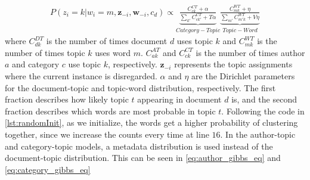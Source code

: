 \begin{equation}\label{eq:category_gibbs_eq}
	\begin{split}
		P(z_i = k|w_i = m, \boldsymbol{z}_{-i}, \boldsymbol{w}_{-i}, c_d) \propto 
		\underbrace{\frac{C^{CT}_{ck} + \alpha}{\sum_{k'} C^{CT}_{ck'} + T\alpha}}_{Category-Topic}
		\underbrace{\frac{C^{WT}_{mk} + \eta}{\sum_{m'} C^{WT}_{m'k} + V\eta}}_{Topic-Word}
	\end{split}
\end{equation}
where $C^{DT}_{dk}$ is the number of times document $d$ uses topic $k$ and $C^{WT}_{mk}$ is the number of times topic $k$ uses word $m$.
$C^{AT}_{ak}$ and $C^{CT}_{ck}$ is the number of times author $a$ and category $c$ use topic $k$, respectively.
$\boldsymbol{z}_{-i}$ represents the topic assignments where the current instance is disregarded.
$\alpha$ and $\eta$ are the Dirichlet parameters for the document-topic and topic-word distribution, respectively.
The first fraction describes how likely topic $t$ appearing in document $d$ is, and the second fraction describes which words are most probable in topic $t$.
Following the code in \autoref{lst:randomInit}, as we initialize, the words get a higher probability of clustering together, since we increase the counts every time at line $16$.
In the author-topic and category-topic models, a metadata distribution is used instead of the document-topic distribution.
This can be seen in \autoref{eq:author_gibbs_eq} and \autoref{eq:category_gibbs_eq}



